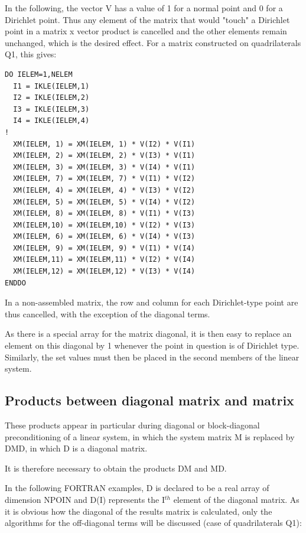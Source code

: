 In the following, the vector V has a value of 1 for a normal point and 0 for a
Dirichlet point. Thus any element of the matrix that would "touch" a Dirichlet
point in a matrix x vector product is cancelled and the other elements remain
unchanged, which is the desired effect. For a matrix constructed on
quadrilaterals Q1, this gives:

\begin{lstlisting}[language=TelFortran]
DO IELEM=1,NELEM
  I1 = IKLE(IELEM,1)
  I2 = IKLE(IELEM,2)
  I3 = IKLE(IELEM,3)
  I4 = IKLE(IELEM,4)
!
  XM(IELEM, 1) = XM(IELEM, 1) * V(I2) * V(I1)
  XM(IELEM, 2) = XM(IELEM, 2) * V(I3) * V(I1)
  XM(IELEM, 3) = XM(IELEM, 3) * V(I4) * V(I1)
  XM(IELEM, 7) = XM(IELEM, 7) * V(I1) * V(I2)
  XM(IELEM, 4) = XM(IELEM, 4) * V(I3) * V(I2)
  XM(IELEM, 5) = XM(IELEM, 5) * V(I4) * V(I2)
  XM(IELEM, 8) = XM(IELEM, 8) * V(I1) * V(I3)
  XM(IELEM,10) = XM(IELEM,10) * V(I2) * V(I3)
  XM(IELEM, 6) = XM(IELEM, 6) * V(I4) * V(I3)
  XM(IELEM, 9) = XM(IELEM, 9) * V(I1) * V(I4)
  XM(IELEM,11) = XM(IELEM,11) * V(I2) * V(I4)
  XM(IELEM,12) = XM(IELEM,12) * V(I3) * V(I4)
ENDDO
\end{lstlisting}

In a non-assembled matrix, the row and column for each Dirichlet-type point are
thus cancelled, with the exception of the diagonal terms.

As there is a special array for the matrix diagonal, it is then easy to replace
an element on this diagonal by 1 whenever the point in question is of Dirichlet
type. Similarly, the set values must then be placed in the second members of
the linear system.

\subsection{Products between diagonal matrix and matrix}

These products appear in particular during diagonal or block-diagonal
preconditioning of a linear system, in which the system matrix M is replaced by
DMD, in which D is a diagonal matrix.

It is therefore necessary to obtain the products DM and MD.

In the following FORTRAN examples, D is declared to be a real array of
dimension NPOIN and D(I) represents the I${}^{th}$ element of the diagonal
matrix. As it is obvious how the diagonal of the results matrix is calculated,
only the algorithms for the off-diagonal terms will be discussed (case of
quadrilaterals Q1):


